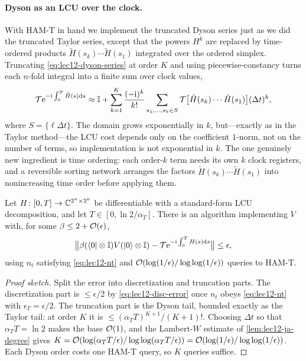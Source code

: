 \paragraph{Dyson as an LCU over the clock.}
With $\mathrm{HAM\text{-}T}$ in hand we implement the truncated Dyson series just as we did
the truncated Taylor series, except that the powers $H^k$ are replaced by time-ordered
products $\tilde H(s_k)\cdots\tilde H(s_1)$ integrated over the ordered simplex. Truncating
\eqref{eq:lec12-dyson-series} at order $K$ and using piecewise-constancy turns each
$n$-fold integral into a finite sum over clock values,
\begin{equation}
  \mathcal T\mathrm{e}^{-\mathrm{i}\int_0^T\tilde H(s)\mathrm{d} s}
  \approx\mathbb{I}+\sum_{k=1}^{K}\frac{(-\mathrm{i})^k}{k!}
    \sum_{s_1,\dots,s_k\in S}
    \mathcal T\bigl[\tilde H(s_k)\cdots\tilde H(s_1)\bigr](\Delta t)^k,
  \label{eq:lec12-truncdyson}
\end{equation}
where $S=\{\ell\Delta t\}$. The domain grows exponentially in $k$, but---exactly as in the
Taylor method---the LCU cost depends only on the coefficient $1$-norm, not on the number of
terms, so implementation is not exponential in $k$. The one genuinely new ingredient is
time ordering: each order-$k$ term needs its own $k$ clock registers, and a reversible
sorting network arranges the factors $\tilde H(s_k)\cdots\tilde H(s_1)$ into nonincreasing
time order before applying them.

\begin{lemma}
\label{lem:lec12-dyson-short}
Let $H\colon[0,T]\to\mathbb{C}^{2^n\times2^n}$ be differentiable with a standard-form LCU
decomposition, and let $T\in[0,\ln2/\alpha_T]$. There is an algorithm implementing $V$ with,
for some $\beta\le2+\mathcal{O}(\epsilon)$,
\begin{equation}
  \bigl\|\beta(\bra0\otimes\mathbb{I})V(\ket0\otimes\mathbb{I})
        -\mathcal T\mathrm{e}^{-\mathrm{i}\int_0^TH(s)\mathrm{d} s}\bigr\|\le\epsilon,
  \label{eq:lec12-dyson-short}
\end{equation}
using $n_t$ satisfying \eqref{eq:lec12-nt} and $\mathcal{O}(\log(1/\epsilon)/\log\log(1/\epsilon))$
queries to $\mathrm{HAM\text{-}T}$.
\end{lemma}

\begin{proof}[Proof sketch]
Split the error into discretization and truncation parts. The discretization part is
$\le\epsilon/2$ by \eqref{eq:lec12-disc-error} once $n_t$ obeys \eqref{eq:lec12-nt} with
$\epsilon_T=\epsilon/2$. The truncation part is the Dyson tail, bounded exactly as the
Taylor tail: at order $K$ it is $\le(\alpha_T T)^{K+1}/(K+1)!$. Choosing $\Delta t$ so that
$\alpha_T T=\ln2$ makes the base $\mathcal{O}(1)$, and the Lambert-$W$ estimate of
\cref{lem:lec12-ja-degree} gives
$K=\mathcal{O}(\log(\alpha_T T/\epsilon)/\log\log(\alpha_T T/\epsilon))
=\mathcal{O}(\log(1/\epsilon)/\log\log(1/\epsilon))$. Each Dyson order costs one
$\mathrm{HAM\text{-}T}$ query, so $K$ queries suffice.
\end{proof}

